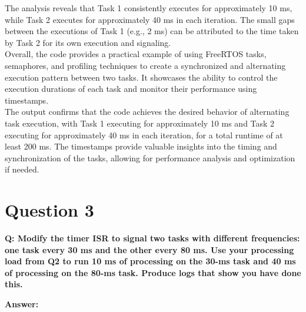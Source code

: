 \documentclass[a4paper,11pt]{article}%
\newenvironment{qanda}{\setlength{\parindent}{0pt}}{\bigskip}
\newcommand{\Q}{\bigskip\bfseries Q: }
\newcommand{\A}{\par\textbf{Answer: } \normalfont}
\begin{document}
\begin{qanda}
The analysis reveals that Task 1 consistently executes for approximately 10 ms, while Task 2 executes for approximately 40 ms in each iteration. The small gaps between the executions of Task 1 (e.g., 2 ms) can be attributed to the time taken by Task 2 for its own execution and signaling.\\

Overall, the code provides a practical example of using FreeRTOS tasks, semaphores, and profiling techniques to create a synchronized and alternating execution pattern between two tasks. It showcases the ability to control the execution durations of each task and monitor their performance using timestamps.\\

The output confirms that the code achieves the desired behavior of alternating task execution, with Task 1 executing for approximately 10 ms and Task 2 executing for approximately 40 ms in each iteration, for a total runtime of at least 200 ms. The timestamps provide valuable insights into the timing and synchronization of the tasks, allowing for performance analysis and optimization if needed.


	






	\pagebreak
	\section{Question 3}
	\Q  Modify the timer ISR to signal two tasks with different frequencies: one task every 30 ms and the other
	every 80 ms. Use your processing load from Q2 to run 10 ms of processing on the 30-ms task and 40
	ms of processing on the 80-ms task. Produce logs that show you have done this.
	\A
	

\end{qanda}
\end{document}
